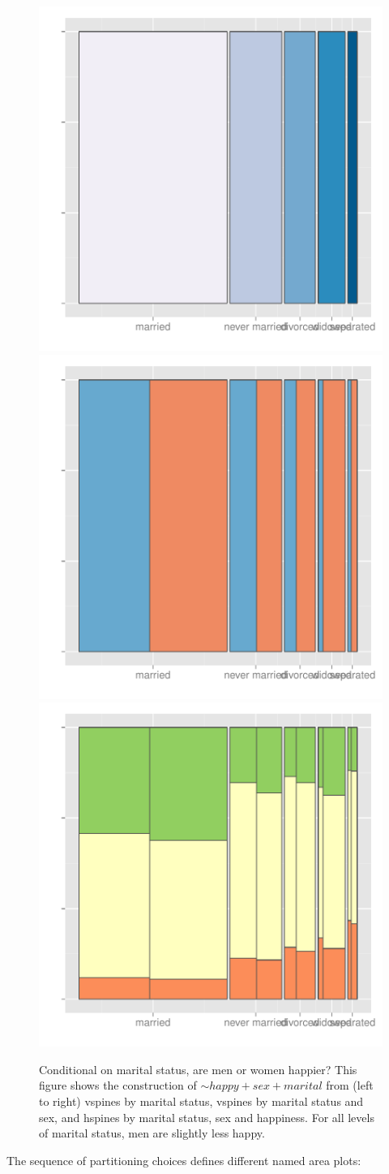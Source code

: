 \documentclass[letterpaper,oneside]{scrartcl}
\begin{document}
\begin{figure}[htbp]
  \centering
    \includegraphics[width=0.33\linewidth]{part-comb-1}%
    \includegraphics[width=0.33\linewidth]{part-comb-2}%
    \includegraphics[width=0.33\linewidth]{part-comb-3}
  \caption{Conditional on marital status, are men or women happier?  This figure shows the construction of $\sim happy + sex + marital$ from (left to right) vspines by marital status, vspines by marital status and sex, and hspines by marital status, sex and happiness.  For all levels of marital status, men are slightly less happy.}
  \label{fig:recursive}
\end{figure}

The sequence of partitioning choices defines different named area plots:
\end{document}
